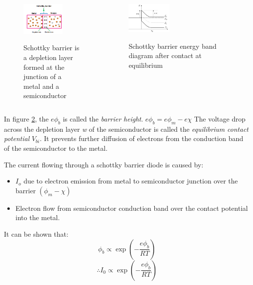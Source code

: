 \begin{frame}
  \begin{columns}
    \begin{figure}[h]
      \caption{Schottky barrier is a depletion layer formed at the junction of a metal and a semiconductor}
      \centering
      \includegraphics[width=0.7\textwidth]{./images/chapter8/fig8_2.png}
      \label{fig:8_2}
    \end{figure}

    \begin{figure}[h]
      \caption{Schottky barrier energy band diagram after contact at equilibrium}
      \centering
      \includegraphics[width=0.4\textwidth]{./images/chapter8/fig8_3.png}
      \label{fig:8_3}
    \end{figure}
  \end{columns}

  In figure \ref{fig:8_3}, the $e\phi_b$ is called the \emph{barrier height}.
  $e\phi_b = e\phi_m - e\chi$
  The voltage drop across the depletion layer \emph{w} of the semiconductor is called the \emph{equilibrium contact potential} $V_{bi}$. It prevents further diffusion of electrons from the conduction band of the semiconductor to the metal.
\end{frame}

\begin{frame}
  The current flowing through a schottky barrier diode is caused by:
  \begin{itemize}
  \item $I_o$ due to electron emission from metal to semiconductor junction over the barrier $(\phi_m - \chi)$
  \item Electron flow from semiconductor conduction band over the contact potential into the metal.
  \end{itemize}

  It can be shown that:
  \[ \phi_b \propto \exp \left(- \frac{e\phi_b}{RT}\right) \]
  \[ \therefore I_0 \propto \exp \left(- \frac{e\phi_b}{RT}\right) \]
\end{frame}

